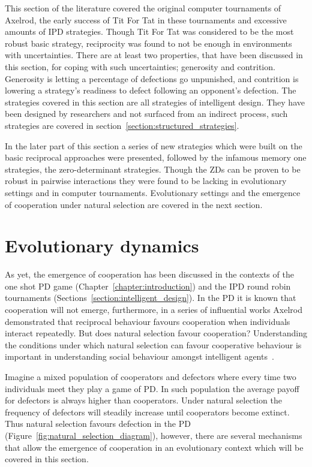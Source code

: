 This section of the literature covered the original computer tournaments of
Axelrod, the early success of Tit For Tat in these tournaments and excessive
amounts of IPD strategies. Though Tit For Tat was
considered to be the most robust basic strategy, reciprocity was found to not
be enough in environments with uncertainties. There are at least two properties,
that have been discussed in this section, for coping with such uncertainties;
generosity and contrition. Generosity is letting a percentage of defections go
unpunished, and contrition is lowering a strategy's readiness to defect
following an opponent's defection. The strategies covered in this section are all
strategies of intelligent design. They have been designed by researchers and
not surfaced from an indirect process, such strategies are covered in
section~\ref{section:structured_strategies}.

In the later part of this section a series of new strategies which were built on
the basic reciprocal approaches were presented, followed by the infamous memory
one strategies, the zero-determinant strategies. Though the ZDs can be proven to be robust
in pairwise interactions they were found to be lacking in evolutionary settings
and in computer tournaments. Evolutionary settings and the emergence
of cooperation under natural selection are covered in the next section.

\section{Evolutionary dynamics}\label{section:evolutionary_dynamics}

As yet, the emergence of cooperation has been discussed in the contexts of the
one shot PD game (Chapter~\ref{chapter:introduction}) and the IPD round robin
tournaments (Sections~\ref{section:intelligent_design}). In the PD it is
known that cooperation will not emerge, furthermore, in a series of influential works
Axelrod demonstrated that reciprocal behaviour favours cooperation when
individuals interact repeatedly. But does natural selection favour cooperation?
Understanding the conditions under which natural selection can favour
cooperative behaviour is important in understanding social behaviour amongst
intelligent agents~\cite{Boyd1987}.

Imagine a mixed population of cooperators and defectors where every
time two individuals meet they play a game of PD. In such population the average
payoff for defectors is always higher than cooperators. Under natural selection
the frequency of defectors will steadily increase until cooperators become
extinct. Thus natural selection favours defection in the PD
(Figure~\ref{fig:natural_selection_diagram}), however, there are several mechanisms
that allow the emergence of cooperation in an evolutionary context which will be
covered in this section.

